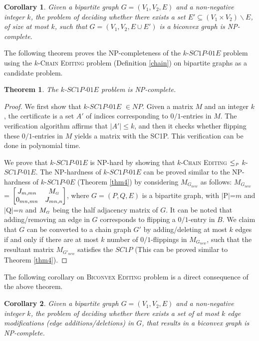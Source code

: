 \documentclass[review, 1p]{elsarticle}
\newtheorem{theorem}{Theorem}
\newtheorem{corollary}{Corollary}
\begin{document}
\begin{corollary}
Given a bipartite graph $G=(V_{1},V_{2},E)$ and a non-negative integer $k$, the problem of deciding whether there exists a set $E' \subseteq (V_{1} \times V_{2})\backslash E$, of size at most $k$, such that $G=(V_{1},V_{2},E \cup E')$ is a biconvex graph is NP-complete.
\end{corollary}
The following theorem proves the NP-completeness of the $k$-$SC1P$-$01E$ problem using the \textsc{$k$-Chain Editing} problem (Definition \ref{chain}) on bipartite graphs as a candidate problem. 
 \begin{theorem}
 The $k$-$SC1P$-$01E$ problem is NP-complete.
 \end{theorem}
 \begin{proof}
We first show that $k$-$SC1P$-$01E$ $ \in NP$. Given a matrix $M$ and an integer
$k$, the certificate is a set $A'$ of indices corresponding to $0/1$-entries in $M$. The verification algorithm affirms that $ \vert A' \vert \leq k$, and then it checks whether flipping these $0/1$-entries in $M$ yields a matrix with the SC1P. This verification can be done in polynomial time.

\indent We prove that $k$-$SC1P$-$01E$ is NP-hard by showing that \textsc{$k$-Chain Editing} $\leq_{\mathsmaller {P}}$ $k$-$SC1P$-$01E$. The NP-hardness of $k$-$SC1P$-$01E$ can be proved similar to the NP-hardness of $k$-$SC1P$-$0E$ (Theorem \ref{thm4}) by considering $M_{G_{new}}$ as follows: $M_{G_{new}}$ = $\begin{bmatrix}J_{m,mn} &M_\mathsmaller{G} \\0_{mn,mn} &J_{mn,n}\end{bmatrix} $, where $G=(P,Q,E)$ is a bipartite graph, with $\lvert$P$\lvert$=$m$ and $\lvert$Q$\lvert$=$n$ and $M_\mathsmaller{G}$ being the half adjacency matrix of $G$. It can be noted that adding/removing an edge in $G$ corresponds to flipping a $0/1$-entry in $B$. We claim that $G$ can be converted to a chain graph $G'$ by adding/deleting at most $k$ edges if and only if there are at most $k$ number of $0/1$-flippings in $M_{G_{new}}$, such that the resultant matrix $M_{G'_{new}}$ satisfies the $SC1P$ (This can be proved similar to Theorem \ref{thm4}). 
\end{proof}
The following corollary on \textsc{Biconvex Editing} problem is a direct consequence of the above theorem.
\begin{corollary}
Given a bipartite graph $G=(V_{1},V_{2},E)$ and a non-negative integer $k$, the problem of deciding whether there exists a set of at most $k$ edge modifications (edge additions/deletions) in $G$, that results in a biconvex graph is NP-complete.
\end{corollary}
\end{document}

